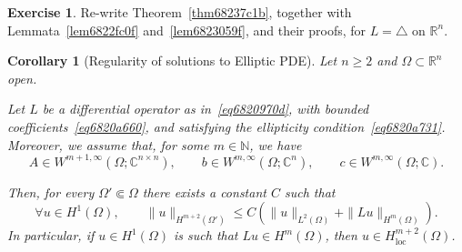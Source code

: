 \documentclass[a4paper,9pt]{amsart}
\newcommand{\N}{\mathbb{N}}	%
\newcommand{\R}{\mathbb{R}}	%
\newcommand{\C}{\mathbb{C}}	%
\newcommand{\loc}{\mathrm{loc}}
\newcommand{\laplacian}{\triangle}
\theoremstyle{plain}
\newtheorem{corollary}[proposition]{Corollary}
\theoremstyle{definition}
\newtheorem{exercise}[proposition]{Exercise}%
\theoremstyle{remark}
\begin{document}
\begin{exercise}
	Re-write Theorem~\ref{thm68237c1b}, together with Lemmata~\ref{lem6822fc0f} and~\ref{lem6823059f}, and their proofs, for $L=\laplacian$ on $\R^n$.
\end{exercise}

\begin{corollary}[Regularity of solutions to Elliptic PDE]\label{cor68237f2f}
	Let $n\ge2$ and $\Omega\subset\R^n$ open.
	
	Let $L$ be a differential operator as in~\eqref{eq6820970d},
	with bounded coefficients~\eqref{eq6820a660},
	and satisfying the ellipticity condition~\eqref{eq6820a731}.
	Moreover, we assume that, for some $m\in\N$, we have
	\begin{equation}\label{eq682385e0}
		A\in W^{m+1,\infty}(\Omega;\C^{n\times n}),\qquad
		b\in W^{m,\infty}(\Omega;\C^n),\qquad
		c\in W^{m,\infty}(\Omega;\C).
	\end{equation}
		
	Then, for every $\Omega'\Subset\Omega$ there exists a constant $C$ such that
	\begin{equation}\label{eq68237d5d}
		\forall u\in H^1(\Omega),\qquad
		\|u\|_{H^{m+2}(\Omega')} \le C (\|u\|_{L^2(\Omega)} + \|Lu\|_{H^m(\Omega)} ) .
	\end{equation}
	In particular, if $u\in H^1(\Omega)$ is such that $Lu\in H^m(\Omega)$, then $u\in H^{m+2}_\loc(\Omega)$.
\end{corollary}
\end{document}
